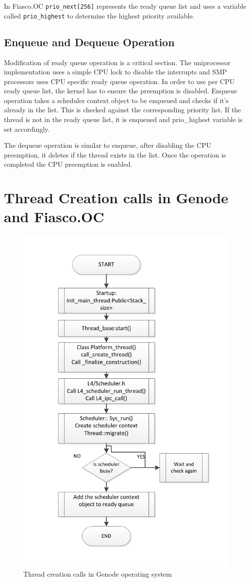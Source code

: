 In Fiasco.OC \texttt{prio\_next[256]} represents the ready queue list and uses a variable called \texttt{prio\_highest} to determine the highest priority available.  

\subsection{Enqueue and Dequeue Operation}	
Modification of ready queue operation is a critical section. The uniprocessor implementation uses a simple CPU lock to disable the interrupts and SMP processors uses CPU specific ready queue operation. In order to use per CPU ready queue list, the kernel has to ensure the preemption is disabled. Enqueue operation takes a scheduler context object to be enqueued and checks if it's already in the list. This is checked against the corresponding priority list. If the thread is not in the ready queue list, it is enqueued and prio\_highest variable is set accordingly. 

The dequeue operation is similar to enqueue, after disabling the CPU preemption, it deletes if the thread exists in the list. Once the operation is completed the CPU preemption is enabled.

\section{Thread Creation calls in Genode and Fiasco.OC}\label{foundations:thread_creation}

\begin{figure}[h]
\centering
\includegraphics[width=0.7\linewidth]{figures/Thread_creation}
\caption{Thread creation calls in Genode operating system}
\label{fig:Thread_creation}
\end{figure}

